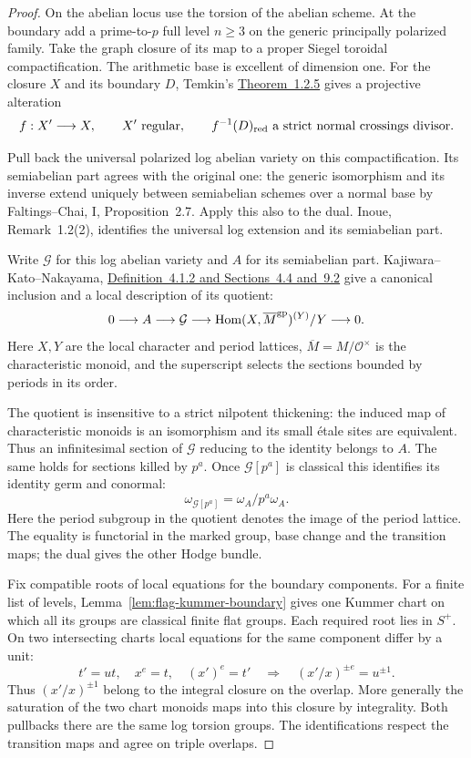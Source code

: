 \begin{proof}
On the abelian locus use the torsion of the abelian scheme. At the boundary add a prime-to-\(p\) full level \(n\ge3\) on the generic principally polarized family. Take the graph closure of its map to a proper Siegel toroidal compactification.
The arithmetic base is excellent of dimension one. For the closure \(X\)
and its boundary \(D\), Temkin's \href{https://annals.math.princeton.edu/2017/186-1/p03}{Theorem~1.2.5} gives a projective alteration
\[
       f:X'\longrightarrow X,\qquad X'\text{ regular},\qquad
              f^{-1}(D)_{\rm red}\text{ a strict normal crossings divisor}.
\]

Pull back the universal polarized log abelian variety on this compactification. Its semiabelian part agrees with the original one: the generic isomorphism and its inverse extend uniquely between semiabelian schemes over a normal base by Faltings--Chai, I, Proposition~2.7. Apply this also to the dual. Inoue, Remark~1.2(2), identifies the universal log extension and its semiabelian part. \cite{inoue-log-flag}

Write \(\mathcal G\) for this log abelian variety and \(A\) for its semiabelian part. Kajiwara--Kato--Nakayama, \href{https://doi.org/10.1017/S002776300000951X}{Definition~4.1.2 and Sections~4.4 and~9.2} give a canonical inclusion and a local description of its quotient:
\[
  0\longrightarrow A\longrightarrow\mathcal G
       \longrightarrow \operatorname{Hom}(X,\overline M^{\rm gp})^{(Y)}/Y
       \longrightarrow0.
\]
Here \(X,Y\) are the local character and period lattices, \(\overline M=M/\mathcal O^\times\) is the characteristic monoid, and the superscript selects the sections bounded by periods in its order. 

The quotient is insensitive to a strict nilpotent thickening: the induced map of characteristic monoids is an isomorphism and its small \'etale sites are equivalent. Thus an infinitesimal section of \(\mathcal G\) reducing to the identity belongs to \(A\). The same holds for sections killed by \(p^a\). Once \(\mathcal G[p^a]\) is classical this identifies its identity germ and conormal:
\[
              \omega_{\mathcal G[p^a]}=\omega_A/p^a\omega_A .
\]
Here the period subgroup in the quotient denotes the image of the period lattice. The equality is functorial in the marked group, base change and the transition maps; the dual gives the other Hodge bundle.

Fix compatible roots of local equations for the boundary components.
For a finite list of levels, Lemma~\ref{lem:flag-kummer-boundary}
gives one Kummer chart on which all its groups are classical finite
flat groups. Each required root lies in \(S^+\). On two intersecting
charts local equations for the same component differ by a unit:
\[
   t'=ut,\quad x^e=t,\quad (x')^e=t'
   \quad\Longrightarrow\quad (x'/x)^{\pm e}=u^{\pm1}.
\]
Thus \((x'/x)^{\pm1}\) belong to the integral closure on the overlap.
More generally the saturation of the two chart monoids maps into
this closure by integrality. Both pullbacks there are the same log
torsion groups. The identifications respect the transition maps and
agree on triple overlaps.


\end{proof}
